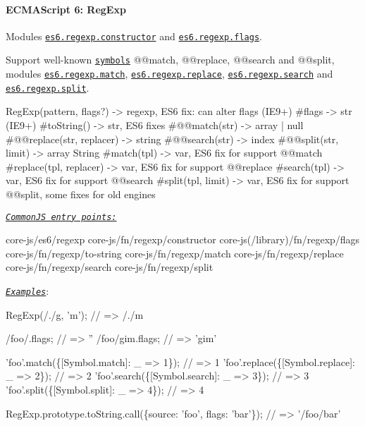  \paragraph*{E\+C\+M\+A\+Script 6\+: Reg\+Exp}

Modules \href{https://github.com/zloirock/core-js/blob/v2.6.0/modules/es6.regexp.constructor.js}{\tt {\ttfamily es6.\+regexp.\+constructor}} and \href{https://github.com/zloirock/core-js/blob/v2.6.0/modules/es6.regexp.flags.js}{\tt {\ttfamily es6.\+regexp.\+flags}}.

Support well-\/known \href{#ecmascript-6-symbol}{\tt symbols} {\ttfamily @@match}, {\ttfamily @@replace}, {\ttfamily @@search} and {\ttfamily @@split}, modules \href{https://github.com/zloirock/core-js/blob/v2.6.0/modules/es6.regexp.match.js}{\tt {\ttfamily es6.\+regexp.\+match}}, \href{https://github.com/zloirock/core-js/blob/v2.6.0/modules/es6.regexp.replace.js}{\tt {\ttfamily es6.\+regexp.\+replace}}, \href{https://github.com/zloirock/core-js/blob/v2.6.0/modules/es6.regexp.search.js}{\tt {\ttfamily es6.\+regexp.\+search}} and \href{https://github.com/zloirock/core-js/blob/v2.6.0/modules/es6.regexp.split.js}{\tt {\ttfamily es6.\+regexp.\+split}}. 
\begin{DoxyCode}
[new] RegExp(pattern, flags?) -> regexp, ES6 fix: can alter flags (IE9+)
  #flags -> str (IE9+)
  #toString() -> str, ES6 fixes
  #@@match(str)             -> array | null
  #@@replace(str, replacer) -> string
  #@@search(str)            -> index
  #@@split(str, limit)      -> array
String
  #match(tpl)             -> var, ES6 fix for support @@match
  #replace(tpl, replacer) -> var, ES6 fix for support @@replace
  #search(tpl)            -> var, ES6 fix for support @@search
  #split(tpl, limit)      -> var, ES6 fix for support @@split, some fixes for old engines
\end{DoxyCode}
 \href{#commonjs}{\tt {\itshape Common\+JS entry points\+:}} 
\begin{DoxyCode}
core-js/es6/regexp
core-js/fn/regexp/constructor
core-js(/library)/fn/regexp/flags
core-js/fn/regexp/to-string
core-js/fn/regexp/match
core-js/fn/regexp/replace
core-js/fn/regexp/search
core-js/fn/regexp/split
\end{DoxyCode}
 \href{http://goo.gl/PiJxBD}{\tt {\itshape Examples}}\+: 
\begin{DoxyCode}
RegExp(/./g, 'm'); // => /./m

/foo/.flags;    // => ''
/foo/gim.flags; // => 'gim'

'foo'.match(\{[Symbol.match]: \_ => 1\});     // => 1
'foo'.replace(\{[Symbol.replace]: \_ => 2\}); // => 2
'foo'.search(\{[Symbol.search]: \_ => 3\});   // => 3
'foo'.split(\{[Symbol.split]: \_ => 4\});     // => 4

RegExp.prototype.toString.call(\{source: 'foo', flags: 'bar'\}); // => '/foo/bar'
\end{DoxyCode}
